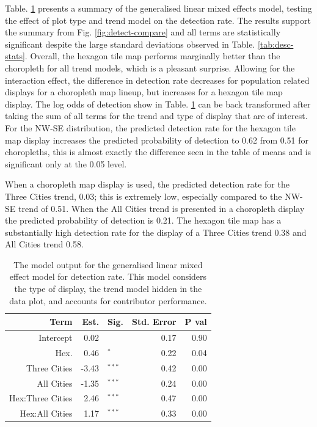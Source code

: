 \documentclass[conference,final,]{IEEEtran}
\begin{document}
Table. \ref{tab:detect-glmer1} presents a summary of the generalised linear mixed effects model, testing the effect of plot type and trend model on the detection rate. The results support the summary from Fig. \ref{fig:detect-compare} and all terms are statistically significant despite the large standard deviations observed in Table. \ref{tab:desc-stats}. Overall, the hexagon tile map performs marginally better than the choropleth for all trend models, which is a pleasant surprise. Allowing for the interaction effect, the difference in detection rate decreases for population related displays for a choropleth map lineup, but increases for a hexagon tile map display.
The log odds of detection show in Table. \ref{tab:detect-glmer1} can be back transformed after taking the sum of all terms for the trend and type of display that are of interest.
For the NW-SE distribution, the predicted detection rate for the hexagon tile map display increases the predicted probability of detection to 0.62 from 0.51 for choropleths, this is almost exactly the difference seen in the table of means and is significant only at the 0.05 level.

When a choropleth map display is used, the predicted detection rate for the Three Cities trend, 0.03; this is extremely low, especially compared to the NW-SE trend of 0.51.
When the All Cities trend is presented in a choropleth display the predicted probability of detection is 0.21.
The hexagon tile map has a substantially high detection rate for the display of a Three Cities trend 0.38 and All Cities trend 0.58.

\begin{table}

\caption{\label{tab:detect-glmer1}The model output for the generalised linear mixed effect model for detection rate. This model considers the type of display, the trend model hidden in the data plot, and accounts for contributor performance.}
\centering
\begin{tabular}[t]{rrlrr}
\toprule
Term & Est. & Sig. & Std. Error & P val\\
\midrule
Intercept & 0.02 & $^{ }$ & 0.17 & 0.90\\
Hex. & 0.46 & $^{*}$ & 0.22 & 0.04\\
\addlinespace
Three Cities & -3.43 & $^{***}$ & 0.42 & 0.00\\
All Cities & -1.35 & $^{***}$ & 0.24 & 0.00\\
\addlinespace
Hex:Three Cities & 2.46 & $^{***}$ & 0.47 & 0.00\\
Hex:All Cities & 1.17 & $^{***}$ & 0.33 & 0.00\\
\bottomrule
\end{tabular}
\end{table}
\end{document}
